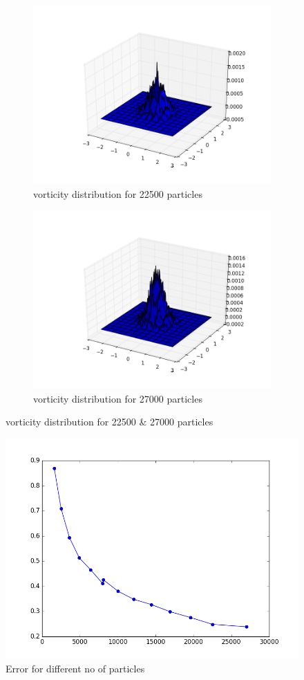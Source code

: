 \documentclass[a4paper,11pt]{article}
\begin{document}
\begin{figure}[h]
	\centering
	\begin{subfigure}[h]{.5\textwidth}
  		\centering
  		\includegraphics[width=.8\linewidth]{vorticity_distribution_for_22500_particles.png}
  		\caption{vorticity distribution for 22500 particles}
  		\label{fig:225}
	\end{subfigure}%
	\begin{subfigure}[h]{.5\textwidth}
  		\centering
  		\includegraphics[width=.8\linewidth]{vorticity_distribution_for_27000_particles.png}
  		\caption{vorticity distribution for 27000 particles}
  		\label{fig:270}
	\end{subfigure}
	\label{fig:Question 1a}
  \caption{vorticity distribution for 22500 \& 27000 particles}

\end{figure}

\begin{figure}[h]
	\centering
    \includegraphics[width = 0.8\linewidth]{Error_for_different_no_of_particles.png}
    \caption{Error for different no of particles}
    \label{fig:err}

	
\end{figure}
\end{document}
